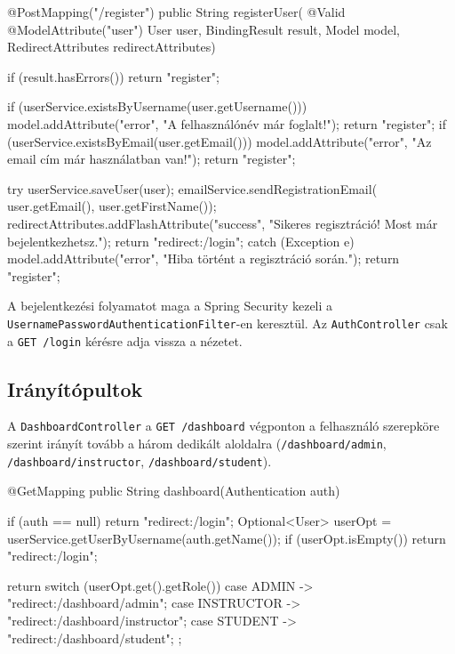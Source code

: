 \begin{java}[caption={Az AuthController regisztrációs POST végpontja},label=java:authcontroller]
@PostMapping("/register")
public String registerUser(
        @Valid @ModelAttribute("user") User user,
        BindingResult result, Model model,
        RedirectAttributes redirectAttributes) {

    if (result.hasErrors()) return "register";

    if (userService.existsByUsername(user.getUsername())) {
        model.addAttribute("error", "A felhasználónév már foglalt!");
        return "register";
    }
    if (userService.existsByEmail(user.getEmail())) {
        model.addAttribute("error",
                "Az email cím már használatban van!");
        return "register";
    }

    try {
        userService.saveUser(user);
        emailService.sendRegistrationEmail(
                user.getEmail(), user.getFirstName());
        redirectAttributes.addFlashAttribute("success",
                "Sikeres regisztráció! Most már bejelentkezhetsz.");
        return "redirect:/login";
    } catch (Exception e) {
        model.addAttribute("error",
                "Hiba történt a regisztráció során.");
        return "register";
    }
}
\end{java}

A bejelentkezési folyamatot maga a Spring Security kezeli a \texttt{UsernamePasswordAuthenticationFilter}-en keresztül. Az \texttt{AuthController} csak a \texttt{GET /login} kérésre adja vissza a nézetet.

\subsection{Irányítópultok}

A \texttt{DashboardController} a \texttt{GET /dashboard} végponton a felhasználó szerepköre szerint irányít tovább a három dedikált aloldalra (\texttt{/dashboard/admin}, \texttt{/dashboard/instructor}, \texttt{/dashboard/student}).

\begin{java}[caption={Szerepköralapú irányítópult-átirányítás},label=java:dashboard]
@GetMapping
public String dashboard(Authentication auth) {
    if (auth == null) return "redirect:/login";
    Optional<User> userOpt =
            userService.getUserByUsername(auth.getName());
    if (userOpt.isEmpty()) return "redirect:/login";

    return switch (userOpt.get().getRole()) {
        case ADMIN      -> "redirect:/dashboard/admin";
        case INSTRUCTOR -> "redirect:/dashboard/instructor";
        case STUDENT    -> "redirect:/dashboard/student";
    };
}
\end{java}

